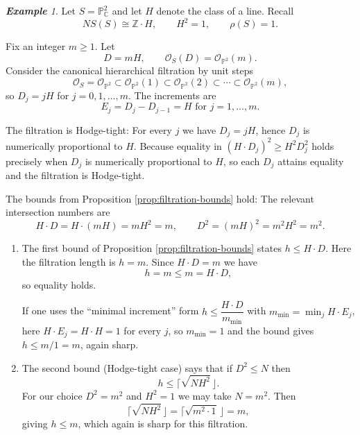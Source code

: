 \documentclass[14pt]{amsart}
\theoremstyle{plain}
\theoremstyle{definition}
\theoremstyle{remark}
\newtheorem{exam}[thm]{\bf Example}
\theoremstyle{example}
\def \P{\mathbb{P}}
\def \Z{\mathbb{Z}}
\def \O{\mathcal{O}}
\begin{document}
\begin{exam}
Let $S=\P^2_{\mathbb{C}}$ and let $H$ denote the class of a line.  Recall
$$
NS(S)\cong\Z\cdot H,\qquad H^2=1,\qquad \rho(S)=1.
$$

Fix an integer $m\ge 1$. Let
$$
D = mH,\qquad \O_S(D)=\O_{\P^2}(m).
$$
Consider the canonical hierarchical filtration by unit steps
$$
\O_S = \O_{\P^2} \subset \O_{\P^2}(1) \subset \O_{\P^2}(2)
\subset \cdots \subset \O_{\P^2}(m),
$$
so $D_j = jH$ for $j=0,1,\dots,m$. The increments are
$$
E_j = D_j - D_{j-1} = H \text{ for }j=1,\dots,m.
$$

The filtration is Hodge-tight: 
For every $j$ we have $D_j=jH$, hence $D_j$ is numerically proportional to $H$.
Because equality in $(H\cdot D_j)^2 \ge H^2 D_j^2$ holds precisely when $D_j$ is numerically proportional to $H$, so each $D_j$ attains equality and the filtration is Hodge-tight.

The bounds from Proposition \ref{prop:filtration-bounds} hold:
The relevant intersection numbers are
$$
H\cdot D = H\cdot (mH)=m H^2 = m,\qquad D^2 = (mH)^2 = m^2 H^2 = m^2.
$$

\begin{enumerate}
\item The first bound of Proposition \ref{prop:filtration-bounds} states $h\le H\cdot D$.
Here the filtration length is $h=m$. Since $H\cdot D=m$ we have
$$
h=m \le m = H\cdot D,
$$
so equality holds.

If one uses the ``minimal increment'' form $h\le \dfrac{H\cdot D}{m_{\min}}$ with
$m_{\min}=\min_j H\cdot E_j$, here $H\cdot E_j=H\cdot H=1$ for every $j$, so
$m_{\min}=1$ and the bound gives $h\le m/1=m$, again sharp.

\item The second bound (Hodge-tight case) says that if $D^2\le N$ then
$$
h \le \big\lceil\sqrt{N H^2}\,\big\rfloor.
$$
For our choice $D^2=m^2$ and $H^2=1$ we may take $N=m^2$. Then
$$
\big\lceil\sqrt{N H^2}\,\big\rfloor = \big\lceil\sqrt{m^2\cdot 1}\,\big\rfloor = m,
$$
giving $h\le m$, which again is sharp for this filtration.
\end{enumerate}

\end{exam}
\end{document}
